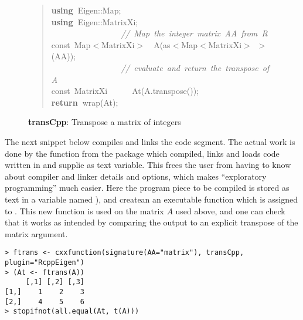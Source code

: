 \documentclass[shortnames,article]{jss}
\newcommand{\hlstd}[1]{\textcolor[rgb]{0,0,0}{#1}}
\newcommand{\hlslc}[1]{\textcolor[rgb]{0.67,0.13,0.13}{\it{#1}}}
\newcommand{\hlsym}[1]{\textcolor[rgb]{0,0,0}{#1}}
\newcommand{\hlkwa}[1]{\textcolor[rgb]{0.61,0.13,0.93}{\bf{#1}}}
\newcommand{\hlkwb}[1]{\textcolor[rgb]{0.13,0.54,0.13}{#1}}
\newcommand{\hlkwd}[1]{\textcolor[rgb]{0,0,0}{#1}}
\begin{document}
\begin{figure}[htb]
  \begin{quote}
    \noindent
    \ttfamily
    \hlstd{}\hlkwa{using\ }\hlstd{Eigen}\hlsym{::}\hlstd{Map}\hlsym{;}\hspace*{\fill}\\
    \hlstd{}\hlkwa{using\ }\hlstd{Eigen}\hlsym{::}\hlstd{MatrixXi}\hlsym{;}\hspace*{\fill}\\
    \hlstd{}\hlstd{\ \ \ \ \ \ \ \ \ \ \ \ \ \ \ \ \ }\hlstd{}\hlslc{//\ Map\ the\ integer\ matrix\ AA\ from\ R}\hspace*{\fill}\\
    \hlstd{}\hlkwb{const\ }\hlstd{Map}\hlsym{$<$}\hlstd{MatrixXi}\hlsym{$>$}\hlstd{\ \ }\hlsym{}\hlstd{}\hlkwd{A}\hlstd{}\hlsym{(}\hlstd{as}\hlsym{$<$}\hlstd{Map}\hlsym{$<$}\hlstd{MatrixXi}\hlsym{$>$\ $>$(}\hlstd{AA}\hlsym{));}\hspace*{\fill}\\
    \hlstd{}\hlstd{\ \ \ \ \ \ \ \ \ \ \ \ \ \ \ \ \ }\hlstd{}\hlslc{//\ evaluate\ and\ return\ the\ transpose\ of\ A}\hspace*{\fill}\\
    \hlstd{}\hlkwb{const\ }\hlstd{MatrixXi}\hlstd{\ \ \ \ \ \ }\hlstd{}\hlkwd{At}\hlstd{}\hlsym{(}\hlstd{A}\hlsym{.}\hlstd{}\hlkwd{transpose}\hlstd{}\hlsym{());}\hspace*{\fill}\\
    \hlstd{}\hlkwa{return\ }\hlstd{}\hlkwd{wrap}\hlstd{}\hlsym{(}\hlstd{At}\hlsym{);}\hlstd{}\hspace*{\fill}
    \normalfont
  \end{quote}
  \caption{\textbf{transCpp}: Transpose a matrix of integers}
  \label{trans}
\end{figure}

The next  snippet below compiles and links the  code
segment. The actual work is done by the function  from the 
package which compiled, links and loads code written in  and
supplie as text variable.  This frees the user from having to know about
compiler and linker details and options, which makes ``exploratory
programming'' much easier.  Here the program piece to be compiled is stored
as text in a variable named ), and  createan
an executable function which is assigned to .  This new function
is used on the matrix $A$ used above, and one can check that it works as intended
by comparing the output to an explicit transpose of the matrix argument.
\begin{verbatim}
> ftrans <- cxxfunction(signature(AA="matrix"), transCpp, plugin="RcppEigen")
> (At <- ftrans(A))
     [,1] [,2] [,3]
[1,]    1    2    3
[2,]    4    5    6
> stopifnot(all.equal(At, t(A)))
\end{verbatim}
\end{document}
